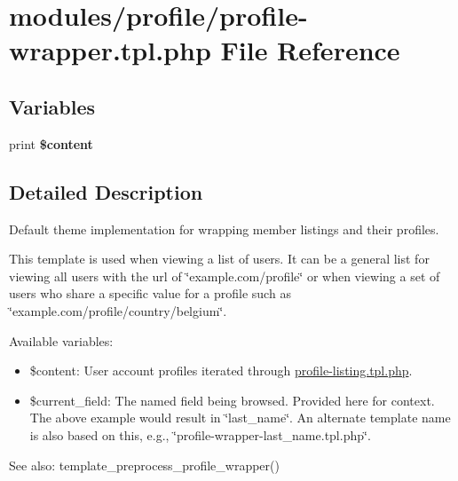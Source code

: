 \hypertarget{profile-wrapper_8tpl_8php}{
\section{modules/profile/profile-wrapper.tpl.php File Reference}
\label{profile-wrapper_8tpl_8php}
}
\subsection*{Variables}
\begin{CompactItemize}
\item 
\hypertarget{profile-wrapper_8tpl_8php_b7b7210f43aa78e34f0b202de894a74c}{
print \textbf{\$content}}
\label{profile-wrapper_8tpl_8php_b7b7210f43aa78e34f0b202de894a74c}

\end{CompactItemize}


\subsection{Detailed Description}
Default theme implementation for wrapping member listings and their profiles.

This template is used when viewing a list of users. It can be a general list for viewing all users with the url of \char`\"{}example.com/profile\char`\"{} or when viewing a set of users who share a specific value for a profile such as \char`\"{}example.com/profile/country/belgium\char`\"{}.

Available variables:\begin{itemize}
\item \$content: User account profiles iterated through \hyperlink{profile-listing_8tpl_8php}{profile-listing.tpl.php}.\item \$current\_\-field: The named field being browsed. Provided here for context. The above example would result in \char`\"{}last\_\-name\char`\"{}. An alternate template name is also based on this, e.g., \char`\"{}profile-wrapper-last\_\-name.tpl.php\char`\"{}.\end{itemize}


\begin{Desc}
\item[See also:]template\_\-preprocess\_\-profile\_\-wrapper() \end{Desc}
